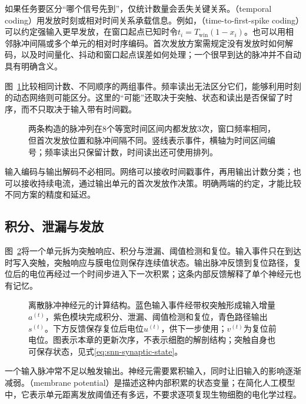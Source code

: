 如果任务要区分“哪个信号先到”，仅统计数量会丢失关键关系。（temporal coding）用发放时刻或相对时间关系承载信息。例如，（time-to-first-spike coding）可以约定强输入更早发放，在窗口起点已知时令$t_i=T_{\mathrm{win}}(1-x_i)$。也可以用相邻脉冲间隔或多个单元的相对时序编码。首次发放方案需规定没有发放时如何解码，以及时间量化、抖动和窗口起点误差如何处理；一个很早到达的脉冲并不自动具有明确含义。

图~\ref{fig:snn-codes}比较相同计数、不同顺序的两组事件。频率读出无法区分它们，能够利用时刻的动态网络则可能区分。这里的“可能”还取决于突触、状态和读出是否保留了时序，而不只取决于输入带有时间戳。
\begin{figure}[htbp]
  \centering
  
  \caption{两条构造的脉冲列在8个等宽时间区间内都发放3次，窗口频率相同，但首次发放位置和脉冲间隔不同。竖线表示事件，横轴为时间区间编号；频率读出只保留计数，时间读出还可使用排列。}
  \label{fig:snn-codes}
\end{figure}

输入编码与输出解码不必相同。网络可以接收时间戳事件，再用输出计数分类；也可以接收持续电流，通过输出单元的首次发放作决策。明确两端的约定，才能比较不同方案的精度和延迟。

\subsection{积分、泄漏与发放}
\label{sec:snn-neurons}

图~\ref{fig:snn-neuron-structure}将一个单元拆为突触响应、积分与泄漏、阈值检测和复位。输入事件只在到达时写入突触，突触响应与膜电位则保存连续值状态。输出脉冲反馈到复位路径，复位后的电位再经过一个时间步进入下一次积累；这条内部反馈解释了单个神经元也有记忆。
\begin{figure}[htbp]
  \centering
  
  \caption{离散脉冲神经元的计算结构。蓝色输入事件经带权突触形成输入增量$a^{(t)}$，紫色模块完成积分、泄漏、阈值检测和复位，青色路径输出$s^{(t)}$。下方反馈保存复位后电位$u^{(t)}$，供下一步使用；$v^{(t)}$为复位前电位。图表示本章的更新次序，不表示细胞的解剖结构；突触自身也可保存状态，见式\eqref{eq:snn-synaptic-state}。}
  \label{fig:snn-neuron-structure}
\end{figure}

一个输入脉冲常不足以触发输出。神经元需要累积输入，同时让旧输入的影响逐渐减弱。（membrane potential）是描述这种内部积累的状态变量；在简化人工模型中，它表示单元距离发放阈值还有多远，不要求逐项复现生物细胞的电化学过程。

